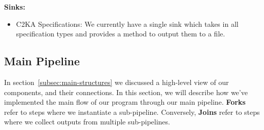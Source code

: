 \documentclass[11pt]{article}
\begin{document}
    \textbf{Sinks:}
    \begin{itemize}
        \item C2KA Specifications: We currently have a single sink which takes in all specification types
        and provides a method to output them to a file.
    \end{itemize}

    \subsection{Main Pipeline}\label{subsec:main-pipeline}
    In section~\ref{subsec:main-structures} we discussed a high-level view of our components, and their connections.
    In this section, we will describe how we've implemented the main flow of our program through our main pipeline.
    \textbf{Forks} refer to steps where we instantiate a sub-pipeline.
    Conversely, \textbf{Joins} refer to steps where we collect outputs from multiple sub-pipelines.
\end{document}
